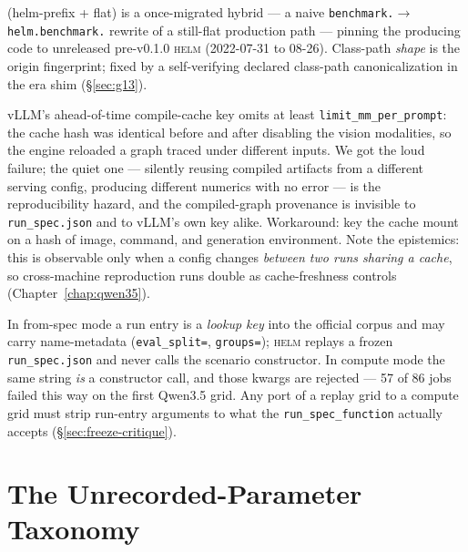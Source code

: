 \documentclass[11pt]{report}
\newcommand{\code}[1]{\texttt{#1}}
\newcommand{\file}[1]{\texttt{#1}}
\begin{document}
\begin{description}[style=nextline,leftmargin=1em]
    (helm-prefix + flat) is a once-migrated hybrid --- a naive
    \code{benchmark.}$\to$\code{helm.benchmark.} rewrite of a still-flat production
    path --- pinning the producing code to unreleased pre-v0.1.0 \textsc{helm}
    (2022-07-31 to 08-26). Class-path \emph{shape} is the origin fingerprint; fixed
    by a self-verifying declared class-path canonicalization in the era shim
    (\S\ref{sec:g13}).
  \item[\textbf{G14. A compiled-artifact cache keyed narrower than the config space
    that shapes the artifacts.}] vLLM's ahead-of-time compile-cache key omits at
    least \code{limit\_mm\_per\_prompt}: the cache hash was identical before and
    after disabling the vision modalities, so the engine reloaded a graph traced
    under different inputs. We got the loud failure; the quiet one --- silently
    reusing compiled artifacts from a different serving config, producing different
    numerics with no error --- is the reproducibility hazard, and the compiled-graph
    provenance is invisible to \file{run\_spec.json} and to vLLM's own key alike.
    Workaround: key the cache mount on a hash of image, command, and generation
    environment. Note the epistemics: this is observable only when a config changes
    \emph{between two runs sharing a cache}, so cross-machine reproduction runs
    double as cache-freshness controls (Chapter~\ref{chap:qwen35}).
  \item[\textbf{G15. A from-spec run entry and a compute run entry are not
    interchangeable.}] In from-spec mode a run entry is a \emph{lookup key} into the
    official corpus and may carry name-metadata (\code{eval\_split=},
    \code{groups=}); \textsc{helm} replays a frozen \code{run\_spec.json} and never
    calls the scenario constructor. In compute mode the same string \emph{is} a
    constructor call, and those kwargs are rejected --- 57 of 86 jobs failed this way
    on the first Qwen3.5 grid. Any port of a replay grid to a compute grid must strip
    run-entry arguments to what the \code{run\_spec\_function} actually accepts
    (\S\ref{sec:freeze-critique}).
\end{description}

\chapter{The Unrecorded-Parameter Taxonomy}
\label{app:unrecorded}
\end{document}
